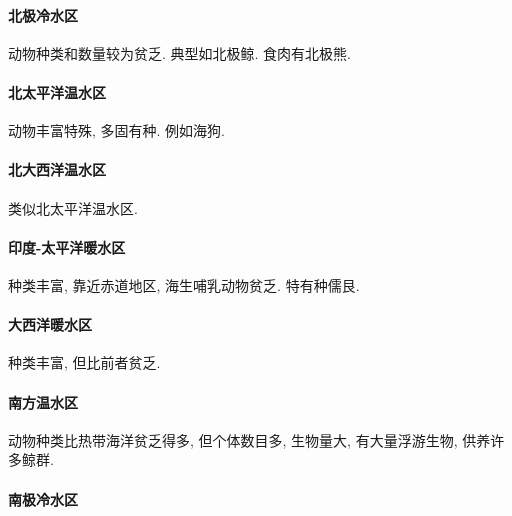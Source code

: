 \documentclass{ctexart}
\begin{document}
\paragraph{北极冷水区} %
\label{par:北极冷水区}

动物种类和数量较为贫乏. 典型如北极鲸. 食肉有北极熊.


\paragraph{北太平洋温水区} %
\label{par:北太平洋温水区}

动物丰富特殊, 多固有种. 例如海狗.


\paragraph{北大西洋温水区} %
\label{par:北大西洋温水区}

类似北太平洋温水区.


\paragraph{印度-太平洋暖水区} %
\label{par:印度_太平洋暖水区}

种类丰富, 靠近赤道地区, 海生哺乳动物贫乏. 特有种儒艮.


\paragraph{大西洋暖水区} %
\label{par:大西洋暖水区}

种类丰富, 但比前者贫乏.


\paragraph{南方温水区} %
\label{par:南方温水区}

动物种类比热带海洋贫乏得多, 但个体数目多, 生物量大, 有大量浮游生物, 供养许多鲸群.


\paragraph{南极冷水区} %
\label{par:南极冷水区}
\end{document}
